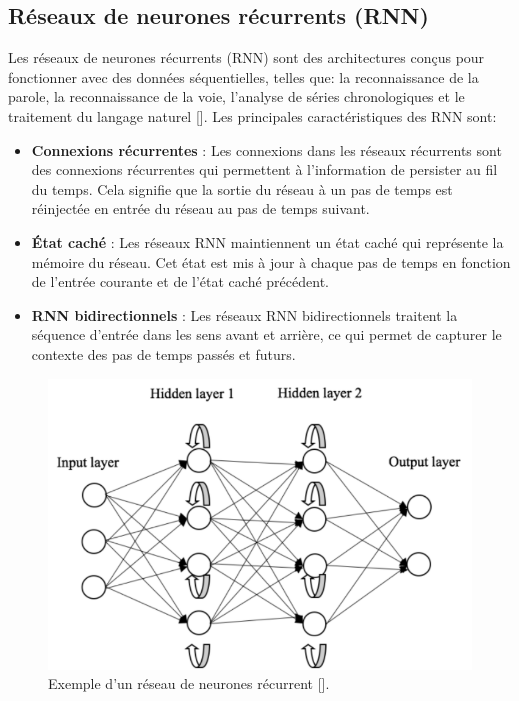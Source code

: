 \medskip

\subsection{Réseaux de neurones récurrents (RNN)}
Les réseaux de neurones récurrents (RNN) sont des architectures conçus pour
fonctionner avec des données séquentielles, telles que: la reconnaissance de la
parole, la reconnaissance de la voie, l'analyse de séries chronologiques et le
traitement du langage naturel [\cite{Goodfellow-et-al-2016}]. Les principales
caractéristiques des RNN sont:
\begin{itemize}
	\item \textbf{Connexions récurrentes} : Les connexions dans les réseaux récurrents sont des connexions récurrentes qui permettent à l'information de persister au fil du temps. Cela signifie que la sortie du réseau à un pas de temps est réinjectée en entrée du réseau au pas de temps suivant.
	\item \textbf{État caché} : Les réseaux RNN maintiennent un état caché qui représente la mémoire du réseau. Cet état est mis à jour à chaque pas de temps en fonction de l'entrée courante et de l'état caché précédent.
	\item \textbf{RNN bidirectionnels} : Les réseaux RNN bidirectionnels traitent la séquence d'entrée dans les sens avant et arrière, ce qui permet de capturer le contexte des pas de temps passés et futurs.
\end{itemize}

\begin{figure}[hbt!]
	\centering
	\includegraphics[width=12cm]{images_pfe/rnn.png}
	\caption{Exemple d'un réseau de neurones récurrent [\cite{kumaraswamy_2021}].}
	\label{fig:schema-reseau}
\end{figure}
\FloatBarrier

